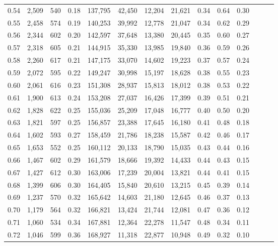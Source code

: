 \begin{tabular}{rrrrrrrrrrrrrr}
0.54 &  2,509 &  540 &  0.18 &  137,795 &   42,450 &  12,204 &  21,621 &  0.34 &  0.64 &      0.30 \\
0.55 &  2,458 &  574 &  0.19 &  140,253 &   39,992 &  12,778 &  21,047 &  0.34 &  0.62 &      0.29 \\
0.56 &  2,344 &  602 &  0.20 &  142,597 &   37,648 &  13,380 &  20,445 &  0.35 &  0.60 &      0.27 \\
0.57 &  2,318 &  605 &  0.21 &  144,915 &   35,330 &  13,985 &  19,840 &  0.36 &  0.59 &      0.26 \\
0.58 &  2,260 &  617 &  0.21 &  147,175 &   33,070 &  14,602 &  19,223 &  0.37 &  0.57 &      0.24 \\
0.59 &  2,072 &  595 &  0.22 &  149,247 &   30,998 &  15,197 &  18,628 &  0.38 &  0.55 &      0.23 \\
0.60 &  2,061 &  616 &  0.23 &  151,308 &   28,937 &  15,813 &  18,012 &  0.38 &  0.53 &      0.22 \\
0.61 &  1,900 &  613 &  0.24 &  153,208 &   27,037 &  16,426 &  17,399 &  0.39 &  0.51 &      0.21 \\
0.62 &  1,828 &  622 &  0.25 &  155,036 &   25,209 &  17,048 &  16,777 &  0.40 &  0.50 &      0.20 \\
0.63 &  1,821 &  597 &  0.25 &  156,857 &   23,388 &  17,645 &  16,180 &  0.41 &  0.48 &      0.18 \\
0.64 &  1,602 &  593 &  0.27 &  158,459 &   21,786 &  18,238 &  15,587 &  0.42 &  0.46 &      0.17 \\
0.65 &  1,653 &  552 &  0.25 &  160,112 &   20,133 &  18,790 &  15,035 &  0.43 &  0.44 &      0.16 \\
0.66 &  1,467 &  602 &  0.29 &  161,579 &   18,666 &  19,392 &  14,433 &  0.44 &  0.43 &      0.15 \\
0.67 &  1,427 &  612 &  0.30 &  163,006 &   17,239 &  20,004 &  13,821 &  0.44 &  0.41 &      0.15 \\
0.68 &  1,399 &  606 &  0.30 &  164,405 &   15,840 &  20,610 &  13,215 &  0.45 &  0.39 &      0.14 \\
0.69 &  1,237 &  570 &  0.32 &  165,642 &   14,603 &  21,180 &  12,645 &  0.46 &  0.37 &      0.13 \\
0.70 &  1,179 &  564 &  0.32 &  166,821 &   13,424 &  21,744 &  12,081 &  0.47 &  0.36 &      0.12 \\
0.71 &  1,060 &  534 &  0.34 &  167,881 &   12,364 &  22,278 &  11,547 &  0.48 &  0.34 &      0.11 \\
0.72 &  1,046 &  599 &  0.36 &  168,927 &   11,318 &  22,877 &  10,948 &  0.49 &  0.32 &      0.10 \\

\end{tabular}
